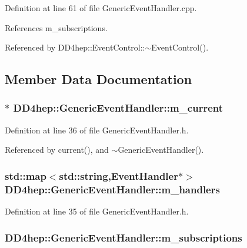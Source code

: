 Definition at line 61 of file GenericEventHandler.cpp.

References m\_\-subscriptions.

Referenced by DD4hep::EventControl::$\sim$EventControl().

\subsection{Member Data Documentation}
\hypertarget{class_d_d4hep_1_1_generic_event_handler_a63ec98dd603fe8124e8afde68f36e37a}{
\subsubsection[{m\_\-current}]{$\ast$ {\bf DD4hep::GenericEventHandler::m\_\-current}}}
\label{class_d_d4hep_1_1_generic_event_handler_a63ec98dd603fe8124e8afde68f36e37a}


Definition at line 36 of file GenericEventHandler.h.

Referenced by current(), and $\sim$GenericEventHandler().\hypertarget{class_d_d4hep_1_1_generic_event_handler_ac699842a86c41b3b4e3424571d83790c}{
\subsubsection[{m\_\-handlers}]{\setlength{\rightskip}{0pt plus 5cm}std::map$<$std::string,{\bf EventHandler}$\ast$$>$ {\bf DD4hep::GenericEventHandler::m\_\-handlers}}}
\label{class_d_d4hep_1_1_generic_event_handler_ac699842a86c41b3b4e3424571d83790c}


Definition at line 35 of file GenericEventHandler.h.\hypertarget{class_d_d4hep_1_1_generic_event_handler_a3401232a3e8f43d779111f456176a3ba}{
\subsubsection[{m\_\-subscriptions}]{ {\bf DD4hep::GenericEventHandler::m\_\-subscriptions}}}
\label{class_d_d4hep_1_1_generic_event_handler_a3401232a3e8f43d779111f456176a3ba}


